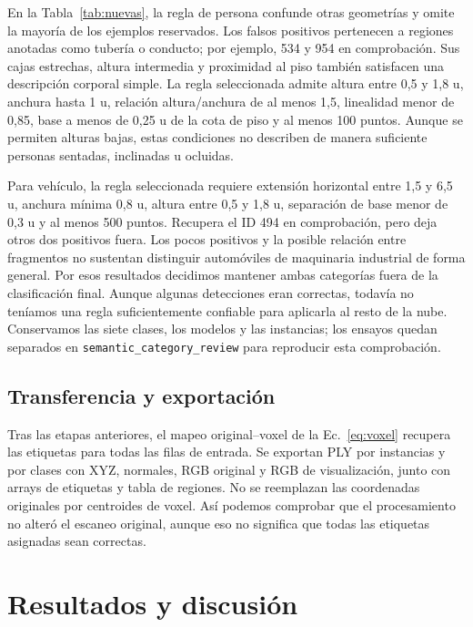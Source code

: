 \documentclass[journal,onecolumn]{IEEEtran}
\begin{document}
En la Tabla~\ref{tab:nuevas}, la regla de persona confunde otras geometrías y omite la mayoría de los ejemplos reservados. Los falsos positivos pertenecen a regiones anotadas como tubería o conducto; por ejemplo, 534 y 954 en comprobación. Sus cajas estrechas, altura intermedia y proximidad al piso también satisfacen una descripción corporal simple. La regla seleccionada admite altura entre 0,5 y 1,8 u, anchura hasta 1 u, relación altura/anchura de al menos 1,5, linealidad menor de 0,85, base a menos de 0,25 u de la cota de piso y al menos 100 puntos. Aunque se permiten alturas bajas, estas condiciones no describen de manera suficiente personas sentadas, inclinadas u ocluidas.

Para vehículo, la regla seleccionada requiere extensión horizontal entre 1,5 y 6,5 u, anchura mínima 0,8 u, altura entre 0,5 y 1,8 u, separación de base menor de 0,3 u y al menos 500 puntos. Recupera el ID 494 en comprobación, pero deja otros dos positivos fuera. Los pocos positivos y la posible relación entre fragmentos no sustentan distinguir automóviles de maquinaria industrial de forma general. Por esos resultados decidimos mantener ambas categorías fuera de la clasificación final. Aunque algunas detecciones eran correctas, todavía no teníamos una regla suficientemente confiable para aplicarla al resto de la nube. Conservamos las siete clases, los modelos y las instancias; los ensayos quedan separados en \texttt{semantic\_category\_review} para reproducir esta comprobación.

\subsection{Transferencia y exportación}
Tras las etapas anteriores, el mapeo original--voxel de la Ec.~\eqref{eq:voxel} recupera las etiquetas para todas las filas de entrada. Se exportan PLY por instancias y por clases con XYZ, normales, RGB original y RGB de visualización, junto con arrays de etiquetas y tabla de regiones. No se reemplazan las coordenadas originales por centroides de voxel. Así podemos comprobar que el procesamiento no alteró el escaneo original, aunque eso no significa que todas las etiquetas asignadas sean correctas.

\section{Resultados y discusión}
\end{document}
